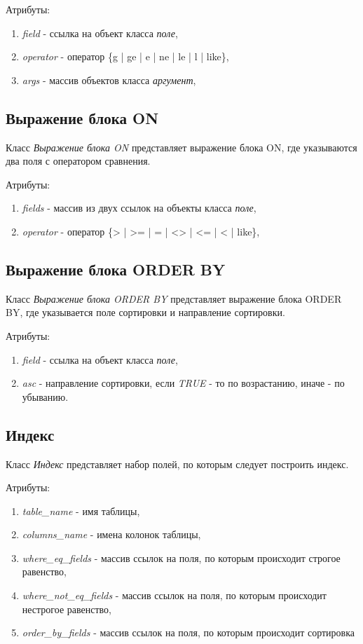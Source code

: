 Атрибуты:
\begin{enumerate}
\item \textit{field} - ссылка на объект класса \textit{поле},
\item \textit{operator} - оператор \{g | ge | e | ne | le | l | like\},
\item \textit{args} - массив объектов класса \textit{аргумент},
\end{enumerate}


\subsection{Выражение блока ON}
Класс \textit{Выражение блока ON} представляет выражение блока ON, где указываются два поля с оператором сравнения.

Атрибуты:
\begin{enumerate}
\item \textit{fields} - массив из двух ссылок на объекты класса \textit{поле},
\item \textit{operator} - оператор \{> | >= | = | <> | <= | < | like\},
\end{enumerate}

\subsection{Выражение блока ORDER BY}
Класс \textit{Выражение блока ORDER BY} представляет выражение блока ORDER BY, где указывается поле сортировки и направление сортировки.

Атрибуты:
\begin{enumerate}
\item \textit{field} - ссылка на объект класса \textit{поле},
\item \textit{asc} - направление сортировки, если \textit{TRUE} - то по возрастанию, иначе - по убыванию.
\end{enumerate}


\subsection{Индекс}
Класс \textit{Индекс} представляет набор полей, по которым следует построить индекс.

Атрибуты:
\begin{enumerate}
\item \textit{table_name} - имя таблицы,
\item \textit{columns_name} - имена колонок таблицы,
\item \textit{where_eq_fields} - массив ссылок на поля, по которым происходит строгое равенство,
\item \textit{where_not_eq_fields} - массив ссылок на поля, по которым происходит нестрогое равенство,
\item \textit{order_by_fields} - массив ссылок на поля, по которым происходит сортировка 
\end{enumerate}

